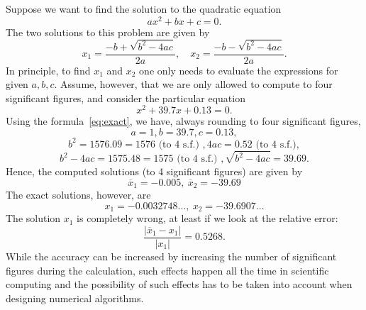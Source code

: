 \begin{example}
Suppose we want to find the solution to the quadratic equation 
\begin{equation*}
ax^2+bx+c=0.
\end{equation*}
The two solutions to this problem are given by
\begin{equation}\label{eq:exact}
  x_1 = \frac{-b+\sqrt{b^2-4ac}}{2a}, \quad x_2 = \frac{-b-\sqrt{b^2-4ac}}{2a}.
\end{equation}
In principle, to find $x_1$ and $x_2$ one only needs to evaluate the expressions for given $a,b,c$. 
Assume, however, that we are only allowed to compute to four significant figures, and 
consider the particular equation
\begin{equation*}
  x^2+39.7x+0.13 = 0.
\end{equation*}
Using the formula~\ref{eq:exact}, we have, always rounding to four significant figures,
\begin{equation*}
 a=1, b=39.7, c=0.13,
\end{equation*}
\begin{equation*}
b^2 = 1576.09 = 1576 \text{ (to 4 s.f.) }, 4ac = 0.52 \text{ (to 4 s.f.)},
\end{equation*}
\begin{equation*}
b^2-4ac = 1575.48 = 1575 \text{ (to 4 s.f.) }, \sqrt{b^2-4ac} = 39.69.
\end{equation*}
Hence, the computed solutions (to 4 significant figures) are given by
\begin{equation*}
  \overline{x}_1 = -0.005, \ \overline{x}_{2}=-39.69
\end{equation*}
The exact solutions, however, are
\begin{equation*}
  x_1 = -0.0032748..., \ x_{2}=-39.6907...
\end{equation*}
The solution $x_1$ is completely wrong, at least if we look at the relative error:
\begin{equation*}
  \frac{|\overline{x}_1-x_1|}{|x_1|} = 0.5268.
\end{equation*}
While the accuracy can be increased by increasing the number of significant figures during the calculation, such effects happen all the time in 
scientific computing and the possibility of such effects has to be taken into account when designing numerical algorithms.


\end{example}
